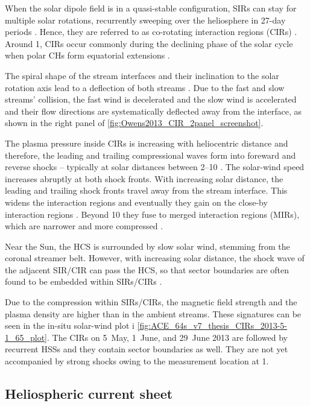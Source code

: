When the solar dipole field is in a quasi-stable configuration, SIRs can stay for multiple solar rotations, recurrently sweeping over the heliosphere in 27-day periods \citep{Gosling1972}. Hence, they are referred to as co-rotating interaction regions (CIRs) \citep{Smith1976,Balogh1999}.
Around \SI{1}{\au}, CIRs occur commonly during the declining phase of the solar cycle when polar CHs form equatorial extensions \citep{Balogh2009}.

The spiral shape of the stream interfaces and their inclination to the solar rotation axis lead to a deflection of both streams \citep{Balogh2009}. Due to the fast and slow streams' collision, the fast wind is decelerated and the slow wind is accelerated and their flow directions are systematically deflected away from the interface, as shown in the right panel of \autoref{fig:Owens2013_CIR_2panel_screenshot}.

The plasma pressure inside CIRs is increasing with heliocentric distance and therefore, the leading and trailing compressional waves form into foreward and reverse shocks -- typically at solar distances between \SIrange{2}{10}{\au} \citep{Smith1976,Balogh2009}. The solar-wind speed increases abruptly at both shock fronts.
With increasing solar distance, the leading and trailing shock fronts travel away from the stream interface. This widens the interaction regions and eventually they gain on the close-by interaction regions \citep{Burlaga1984}. Beyond \SI{10}{\au} they fuse to merged interaction regions (MIRs), which are narrower and more compressed \citep{Burlaga1985}.

Near the Sun, the HCS is surrounded by slow solar wind, stemming from the coronal streamer belt. However, with increasing solar distance, the shock wave of the adjacent SIR/CIR can pass the HCS, so that sector boundaries are often found to be embedded within SIRs/CIRs \citep{Gosling1999}.

Due to the compression within SIRs/CIRs, the magnetic field strength and the plasma density are higher than in the ambient streams. These signatures can be seen in the in-situ solar-wind plot i \autoref{fig:ACE_64s_v7_thesis_CIRs_2013-5-1_65_plot}. The CIRs on 5~May, 1~June, and 29~June 2013 are followed by recurrent HSSs and they contain sector boundaries as well. They are not yet accompanied by strong shocks owing to the measurement location at \SI{1}{\au}.


\subsection{Heliospheric current sheet}

